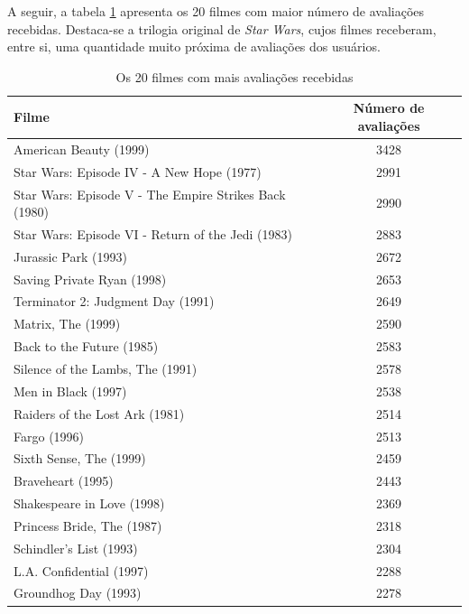 \documentclass[12pt,a4paper,header]{abnt}
\begin{document}
A seguir, a tabela \ref{top20_filmes} apresenta os 20 filmes com maior número de avaliações recebidas. Destaca-se a trilogia original de \textit{Star Wars}, cujos filmes receberam, entre si, uma quantidade muito próxima de avaliações dos usuários.

\begin{table}[h]
\caption{Os 20 filmes com mais avaliações recebidas}
\label{top20_filmes}
\begin{tabular}{@{}lc@{}}
\toprule
\textbf{Filme}                                                 & \textbf{Número de avaliações} \\ \midrule
American Beauty (1999)                                & 3428    \\
Star Wars: Episode IV - A New Hope (1977)             & 2991    \\
Star Wars: Episode V - The Empire Strikes Back (1980) & 2990    \\
Star Wars: Episode VI - Return of the Jedi (1983)     & 2883    \\
Jurassic Park (1993)                                  & 2672    \\
Saving Private Ryan (1998)                            & 2653    \\
Terminator 2: Judgment Day (1991)                     & 2649    \\
Matrix, The (1999)                                    & 2590    \\
Back to the Future (1985)                             & 2583    \\
Silence of the Lambs, The (1991)                      & 2578    \\
Men in Black (1997)                                   & 2538    \\
Raiders of the Lost Ark (1981)                        & 2514    \\
Fargo (1996)                                          & 2513    \\
Sixth Sense, The (1999)                               & 2459    \\
Braveheart (1995)                                     & 2443    \\
Shakespeare in Love (1998)                            & 2369    \\
Princess Bride, The (1987)                            & 2318    \\
Schindler's List (1993)                               & 2304    \\
L.A. Confidential (1997)                              & 2288    \\
Groundhog Day (1993)                                  & 2278    \\ \bottomrule
\end{tabular}
\end{table}
\end{document}
